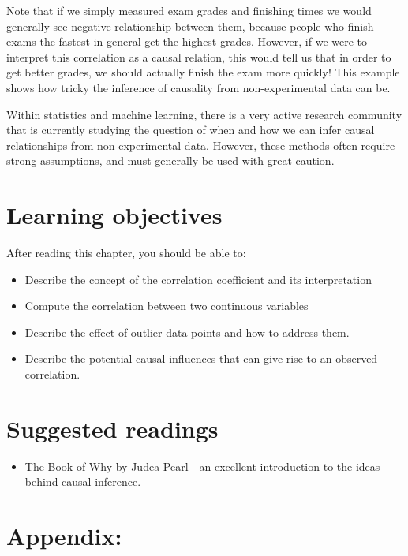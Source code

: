 \documentclass[
  12pt,
]{book}
\providecommand{\tightlist}{%
  \setlength{\itemsep}{0pt}\setlength{\parskip}{0pt}}
\begin{document}
Note that if we simply measured exam grades and finishing times we would generally see negative relationship between them, because people who finish exams the fastest in general get the highest grades. However, if we were to interpret this correlation as a causal relation, this would tell us that in order to get better grades, we should actually finish the exam more quickly! This example shows how tricky the inference of causality from non-experimental data can be.

Within statistics and machine learning, there is a very active research community that is currently studying the question of when and how we can infer causal relationships from non-experimental data. However, these methods often require strong assumptions, and must generally be used with great caution.

\hypertarget{learning-objectives-12}{%
\section{Learning objectives}\label{learning-objectives-12}}

After reading this chapter, you should be able to:

\begin{itemize}
\tightlist
\item
  Describe the concept of the correlation coefficient and its interpretation
\item
  Compute the correlation between two continuous variables
\item
  Describe the effect of outlier data points and how to address them.
\item
  Describe the potential causal influences that can give rise to an observed correlation.
\end{itemize}

\hypertarget{suggested-readings-9}{%
\section{Suggested readings}\label{suggested-readings-9}}

\begin{itemize}
\tightlist
\item
  \href{http://bayes.cs.ucla.edu/WHY/}{The Book of Why} by Judea Pearl - an excellent introduction to the ideas behind causal inference.
\end{itemize}

\hypertarget{appendix-4}{%
\section{Appendix:}\label{appendix-4}}
\end{document}
